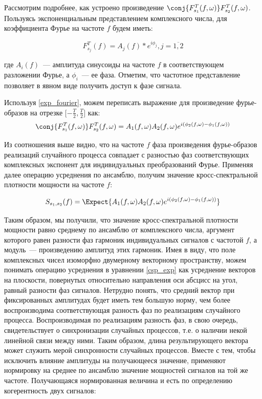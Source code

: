Рассмотрим подробнее, как устроено произведение
$\conj{F_{s_1}^T(f,\omega)} F_{s_2}^T(f,\omega)$.
Пользуясь экспоненциальным представлением комплексного числа, для коэффициента Фурье на частоте $f$
будем иметь:

\begin{equation}
    F_{s_j}^T(f) = A_j(f) * e^{i\phi_j}, j=\overline{1,2}
    \label{exp_fourier}
\end{equation}

где $A_i(f)$~--- амплитуда синусоиды на частоте $f$ в соответствующем
разложении Фурье, а $\phi_i$~--- ее фаза.  Отметим, что частотное представление
позволяет в явном виде получить доступ к фазе сигнала.

Используя \ref{exp_fourier}, можем переписать выражение для произведение фурье-образов
на отрезке $\Big[{-\frac{T}{2}}, \frac{T}{2}\Big]$ как:
\begin{equation}
    \conj{F_{s_1}^T(f,\omega)} F_{s_2}^T(f,\omega) =
    A_1(f,\omega)A_2(f,\omega) e^{i(\phi_2(f,\omega) - \phi_1(f,\omega))}
\end{equation}

Из соотношения выше видно, что на частоте $f$ фаза произведения фурье-образов
реализаций случайного процесса совпадает с разностью фаз соответствующих
комплексных экспонент для индивидуальных преобразований Фурье. Применяя далее
операцию усреднения по ансамблю, получим значение кросс-спектральной плотности
мощности на частоте $f$:

\begin{equation}
    S_{s_1, s_2}(f) = \Expect{A_1(f,\omega)A_2(f,\omega) e^{i(\phi_2(f,\omega) - \phi_1(f,\omega))}}
    \label{csp_exp}
\end{equation}

Таким образом, мы получили, что значение кросс-спектральной плотности мощности
равно среднему по ансамблю от комплексного числа, аргумент которого равен
разности фаз гармоник индивидуальных сигналов с частотой $f$, а  модуль~---
произведению амплитуд этих гармоник.  Имея в виду, что поле комплексных чисел
изоморфно двумерному векторному пространству, можем понимать операцию
усреднения в уравнении \ref{csp_exp} как усреднение векторов на плоскости,
повернутых относительно направления оси абсцисс на угол, равный разности фаз
сигналов.  Нетрудно понять, что средний вектор при фиксированных амплитудах
будет иметь тем большую норму, чем более воспроизводима соответствующая
разность фаз по реализациям случайного процесса.  Воспроизводимая по
реализациям разность фаз, в свою очередь, свидетельствует о синхронизации
случайных процессов, т.е. о наличии некой линейной связи между ними.  Таким
образом, длина результирующего вектора может служить мерой синхронности
случайных процессов.  Вместе с тем, чтобы исключить влияние амплитуды на
получающееся значение, применяют нормировку на среднее по ансамблю значение
мощностей сигналов на той же частоте.  Получающаяся нормированная величина и
есть по определению когерентность двух сигналов:

